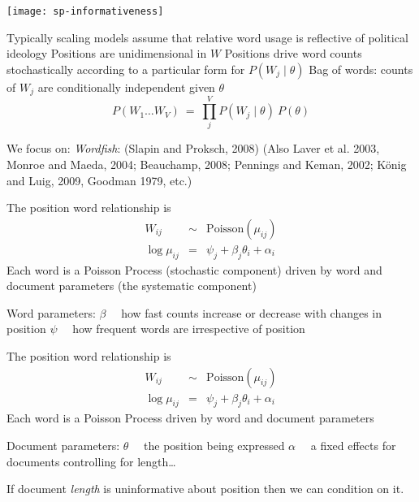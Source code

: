 \documentclass{mediumfoils}
\begin{document}
\newpage

\centerline{\texttt{[image: sp-informativeness]}}



Typically scaling models assume that
\ita
\itm relative word usage is reflective of political ideology
\itm Positions are unidimensional in $W$ 
\itm Positions drive word counts stochastically according to a particular form for $P(W_{j} \mid \theta)$
\itm Bag of words: counts of $W_{j}$ are conditionally independent given $\theta$
\[
P(W_{1}\ldots W_{V}) ~=~ \prod^{V}_{j} P(W_{j} \mid \theta)~ P(\theta)
\] 
\itz 


We focus on:
\ita
\itm \textit{Wordfish}: (Slapin and Proksch, 2008)
\itm (Also Laver et al. 2003, Monroe and Maeda, 2004; Beauchamp, 2008; Pennings and Keman, 2002; K\"{o}nig and Luig, 2009, Goodman 1979, etc.)
\itz



The position word relationship is
\begin{eqnarray*}
W_{ij} &\sim& \text{Poisson}(\mu_{ij})\\
\log \mu_{ij} &=& \psi_{j} + \beta_{j}\theta_{i} +  \alpha_{i} 
\end{eqnarray*}
Each word is a Poisson Process (stochastic component) driven by word and document parameters (the systematic component)


Word parameters:
\ita
\itm $\beta$~~ how fast counts increase or decrease with changes in position
\itm $\psi$~~ how frequent words are irrespective of position
\itz



The position word relationship is
\begin{eqnarray*}
W_{ij} &\sim& \text{Poisson}(\mu_{ij})\\
\log \mu_{ij} &=& \psi_{j} + \beta_{j}\theta_{i} +  \alpha_{i}
\end{eqnarray*}
Each word is a Poisson Process driven by word and document parameters

Document parameters:
\ita
\itm $\theta$~~ the position being expressed
\itm $\alpha$~~ a fixed effects for documents controlling for length\ldots
\itz


If document \textit{length} is uninformative about position then we can condition on it. 
\end{document}
